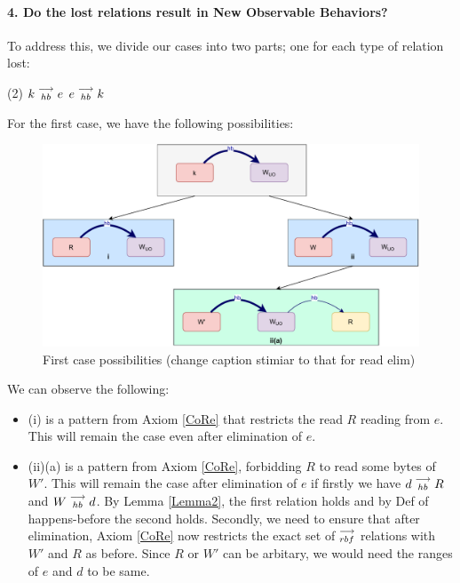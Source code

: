 \paragraph{4. Do the lost relations result in New Observable Behaviors?}

    To address this, we divide our cases into two parts; one for each type of relation lost:
    \begin{tasks}(2)
        \task $k\stackrel{\longrightarrow}{_{hb}}e$
        \task $e\stackrel{\longrightarrow}{_{hb}}k$
    \end{tasks}

    For the first case, we have the following possibilities:
    \begin{figure}[H]
        \centering
        \includegraphics[scale=0.5]{6.Elimination/1.ValidEliminationCandidate/WriteElimProof/ProofParts/Part4Case1.pdf}
        \caption{First case possibilities (change caption stimiar to that for read elim)}
    \end{figure}

    We can observe the following:
    \begin{itemize}
        \item (i) is a pattern from Axiom \ref{CoRe} that restricts the read $R$ reading from $e$. This will remain the case even after elimination of $e$.
        \item (ii)(a) is a pattern from Axiom \ref{CoRe}, forbidding $R$ to read some bytes of $W'$. 
        This will remain the case after elimination of $e$ if firstly we have $d\stackrel{\longrightarrow}{_{hb}}R$ and $W\stackrel{\longrightarrow}{_{hb}}d$.
        By Lemma \ref{Lemma2}, the first relation holds and by Def of happens-before the second holds. 
        Secondly, we need to ensure that after elimination, Axiom \ref{CoRe} now restricts the exact set of $\stackrel{\longrightarrow}{_{rbf}}$ relations with $W'$ and $R$ as before. 
        Since $R$ or $W'$ can be arbitary, we would need the ranges of $e$ and $d$ to be same.
    \end{itemize}

